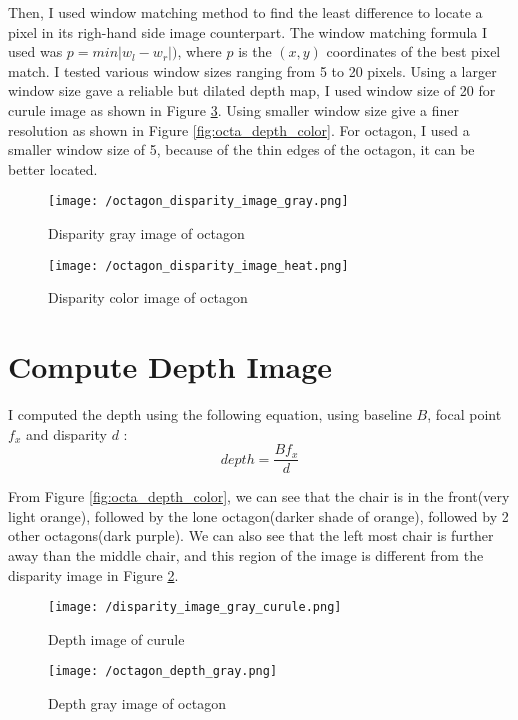 \documentclass[a4paper, 10pt]{article}
\begin{document}
\begin{multicols}{2}
		Then, I used window matching method to find the least difference to locate a pixel in its righ-hand side image counterpart. The window matching formula I used was $p = min|w_{l}-w_{r}|)$, where $p$ is the $(x,y)$ coordinates of the best pixel match. I tested various window sizes ranging from 5 to 20 pixels. Using a larger window size gave a reliable but dilated depth map, I used window size of 20 for curule image as shown in Figure \ref{fig:curule_depth_gray}. Using smaller window size give a finer resolution as shown in Figure \ref{fig:octa_depth_color}. For octagon, I used a smaller window size of 5, because of the thin edges of the octagon, it can be better located.
		
		
		\begin{figure}[H]
			\centering
			\texttt{[image: /octagon\_disparity\_image\_gray.png]}
			\caption{Disparity gray image of octagon}
			\label{fig:octagon_disparity_gray}
		\end{figure}
		
		\begin{figure}[H]
			\centering
			\texttt{[image: /octagon\_disparity\_image\_heat.png]}
			\caption{Disparity color image of octagon}
			\label{fig:octagon_disparity_color}
		\end{figure}
		
		
		\section{Compute Depth Image}
		I computed the depth using the following equation, using baseline $B$, focal point $f_{x}$ and disparity $d$ :
		\[depth = \frac{Bf_{x}}{d}\]
		
		 From Figure \ref{fig:octa_depth_color}, we can see that the chair is in the front(very light orange), followed by the lone octagon(darker shade of orange), followed by 2 other octagons(dark purple). We can also see that the left most chair is further away than the middle chair, and this region of the image is different from the disparity image in Figure \ref{fig:octagon_disparity_color}.
	 
		\begin{figure}[H]
		\centering
		\texttt{[image: /disparity\_image\_gray\_curule.png]}
		\caption{Depth image of curule}
		\label{fig:curule_depth_gray}
		\end{figure}



		\begin{figure}[H]
			\centering
			\texttt{[image: /octagon\_depth\_gray.png]}
			\caption{Depth gray image of octagon}
			\label{fig:octa_depth_gray}
		\end{figure}


\end{multicols}
\end{document}
